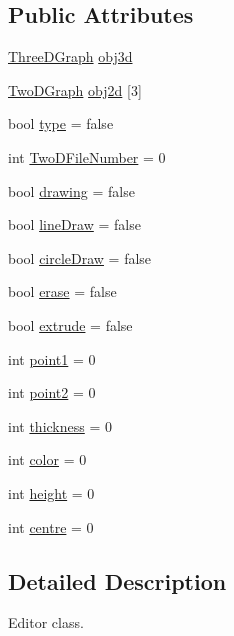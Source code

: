 \subsection*{Public Attributes}
\begin{DoxyCompactItemize}
\item 
\hyperlink{classThreeDGraph}{Three\+D\+Graph} \hyperlink{classInteractive__editor_a2620ec3a4c9f18e9cd873e2a90c1167d}{obj3d}
\item 
\hyperlink{classTwoDGraph}{Two\+D\+Graph} \hyperlink{classInteractive__editor_a61dd4318434d640cc5191e038b66a407}{obj2d} \mbox{[}3\mbox{]}
\item 
bool \hyperlink{classInteractive__editor_a93c2f2041e432c8047d51942345cc3f9}{type} = false
\item 
int \hyperlink{classInteractive__editor_a016e5e8e9a124977ab6048c90980be97}{Two\+D\+File\+Number} = 0
\item 
bool \hyperlink{classInteractive__editor_ace62b483a0866c64212ee0c641445c7a}{drawing} = false
\item 
bool \hyperlink{classInteractive__editor_aa0de8abac09ce2259252fba6c1958e83}{line\+Draw} = false
\item 
bool \hyperlink{classInteractive__editor_a1d7855fd44f17fb78dbb86e8b7962758}{circle\+Draw} = false
\item 
bool \hyperlink{classInteractive__editor_ac2f2f1dfb6c21585d4ed5ed043e41b25}{erase} = false
\item 
bool \hyperlink{classInteractive__editor_a3e4db48e715e92969ba3ec52ab14ce8d}{extrude} = false
\item 
int \hyperlink{classInteractive__editor_a07fe2897bcad8eabf5b98e01a162b2a1}{point1} = 0
\item 
int \hyperlink{classInteractive__editor_af60245cb328db4c6b1ca00f1512dfc75}{point2} = 0
\item 
int \hyperlink{classInteractive__editor_a65f9bb481055109e9d52e2a6bc2db58e}{thickness} = 0
\item 
int \hyperlink{classInteractive__editor_a8bb78acdc55bebbe34bc545eb720217c}{color} = 0
\item 
int \hyperlink{classInteractive__editor_aced5ec777fe62fb280f3668a1c59f9b7}{height} = 0
\item 
int \hyperlink{classInteractive__editor_acb67c8393df8fe6f6f938f0609f24050}{centre} = 0
\end{DoxyCompactItemize}


\subsection{Detailed Description}
Editor class. 

